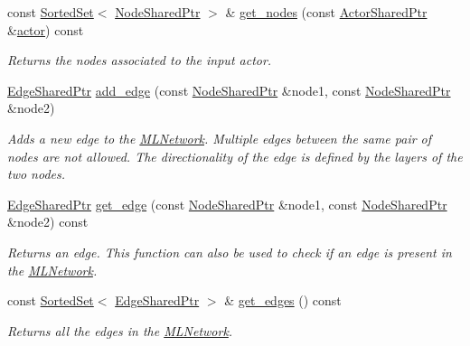 \begin{DoxyCompactItemize}
const \hyperlink{classmlnet_1_1_sorted_set}{Sorted\+Set}$<$ \hyperlink{namespacemlnet_acf8b1b6deb52e7dacfc676c689f9a10c}{Node\+Shared\+Ptr} $>$ \& \hyperlink{classmlnet_1_1_m_l_network_a9c62dc703796e78a2bad9959fcfd9632}{get\+\_\+nodes} (const \hyperlink{namespacemlnet_a714fd98ffaeaadd5c38d61fa53dc4d24}{Actor\+Shared\+Ptr} \&\hyperlink{classmlnet_1_1actor}{actor}) const 
\begin{DoxyCompactList}\small\item\em Returns the nodes associated to the input actor. \end{DoxyCompactList}\item 
\hyperlink{namespacemlnet_a33e88c3df9bea691a269d5e5d8bea57d}{Edge\+Shared\+Ptr} \hyperlink{classmlnet_1_1_m_l_network_a41360f23aedbece293900ab0098348cd}{add\+\_\+edge} (const \hyperlink{namespacemlnet_acf8b1b6deb52e7dacfc676c689f9a10c}{Node\+Shared\+Ptr} \&node1, const \hyperlink{namespacemlnet_acf8b1b6deb52e7dacfc676c689f9a10c}{Node\+Shared\+Ptr} \&node2)
\begin{DoxyCompactList}\small\item\em Adds a new edge to the \hyperlink{classmlnet_1_1_m_l_network}{M\+L\+Network}. Multiple edges between the same pair of nodes are not allowed. The directionality of the edge is defined by the layers of the two nodes. \end{DoxyCompactList}\item 
\hyperlink{namespacemlnet_a33e88c3df9bea691a269d5e5d8bea57d}{Edge\+Shared\+Ptr} \hyperlink{classmlnet_1_1_m_l_network_ad122937d266e66e75d47b2c43ccfe35b}{get\+\_\+edge} (const \hyperlink{namespacemlnet_acf8b1b6deb52e7dacfc676c689f9a10c}{Node\+Shared\+Ptr} \&node1, const \hyperlink{namespacemlnet_acf8b1b6deb52e7dacfc676c689f9a10c}{Node\+Shared\+Ptr} \&node2) const 
\begin{DoxyCompactList}\small\item\em Returns an edge. This function can also be used to check if an edge is present in the \hyperlink{classmlnet_1_1_m_l_network}{M\+L\+Network}. \end{DoxyCompactList}\item 
const \hyperlink{classmlnet_1_1_sorted_set}{Sorted\+Set}$<$ \hyperlink{namespacemlnet_a33e88c3df9bea691a269d5e5d8bea57d}{Edge\+Shared\+Ptr} $>$ \& \hyperlink{classmlnet_1_1_m_l_network_af2b8de761af4708080e24f1444518c59}{get\+\_\+edges} () const 
\begin{DoxyCompactList}\small\item\em Returns all the edges in the \hyperlink{classmlnet_1_1_m_l_network}{M\+L\+Network}. \end{DoxyCompactList}\item 

\end{DoxyCompactItemize}
